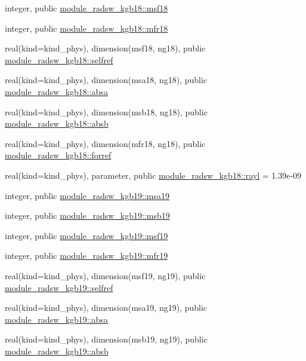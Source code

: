 \begin{DoxyCompactItemize}
integer, public \hyperlink{group__module__radsw__main_ga1d74002f71710887e45df89d3897a10a}{module\+\_\+radsw\+\_\+kgb18\+::msf18}
\item 
integer, public \hyperlink{group__module__radsw__main_ga9fa8140413e7ec769baea4f207e58393}{module\+\_\+radsw\+\_\+kgb18\+::mfr18}
\item 
real(kind=kind\+\_\+phys), dimension(msf18, ng18), public \hyperlink{group__module__radsw__main_ga488f807878d909b8f69457b0d7d8ac6a}{module\+\_\+radsw\+\_\+kgb18\+::selfref}
\item 
real(kind=kind\+\_\+phys), dimension(msa18, ng18), public \hyperlink{group__module__radsw__main_ga8a7787776bd057b1815e92a5f58b9cac}{module\+\_\+radsw\+\_\+kgb18\+::absa}
\item 
real(kind=kind\+\_\+phys), dimension(msb18, ng18), public \hyperlink{group__module__radsw__main_ga858680db0ee5e9a599639844a91f8f06}{module\+\_\+radsw\+\_\+kgb18\+::absb}
\item 
real(kind=kind\+\_\+phys), dimension(mfr18, ng18), public \hyperlink{group__module__radsw__main_ga0efc293c91de3d17b29ed713ff09d7a9}{module\+\_\+radsw\+\_\+kgb18\+::forref}
\item 
real(kind=kind\+\_\+phys), parameter, public \hyperlink{group__module__radsw__main_ga9cd3f07e259e4982c7ef2889fee6cccb}{module\+\_\+radsw\+\_\+kgb18\+::rayl} = 1.\+39e-\/09
\item 
integer, public \hyperlink{namespacemodule__radsw__kgb19_a498993cce64baa8f22c8dfdce632cf85}{module\+\_\+radsw\+\_\+kgb19\+::msa19}
\item 
integer, public \hyperlink{group__module__radsw__main_ga42771fcf9dd17b5c9d0d03cb2bf1c923}{module\+\_\+radsw\+\_\+kgb19\+::msb19}
\item 
integer, public \hyperlink{group__module__radsw__main_ga86778b12ff439f4f83fda891e7ae2bfe}{module\+\_\+radsw\+\_\+kgb19\+::msf19}
\item 
integer, public \hyperlink{group__module__radsw__main_ga57f837ef4316dc2441bca3fde3998156}{module\+\_\+radsw\+\_\+kgb19\+::mfr19}
\item 
real(kind=kind\+\_\+phys), dimension(msf19, ng19), public \hyperlink{group__module__radsw__main_gadb26cae00c05ac5c048a4db5a319a2eb}{module\+\_\+radsw\+\_\+kgb19\+::selfref}
\item 
real(kind=kind\+\_\+phys), dimension(msa19, ng19), public \hyperlink{group__module__radsw__main_gad9a6fc80122a2f06d9f2277d74e00c85}{module\+\_\+radsw\+\_\+kgb19\+::absa}
\item 
real(kind=kind\+\_\+phys), dimension(msb19, ng19), public \hyperlink{group__module__radsw__main_gad1171c012a1615c4b98eb3e95276867d}{module\+\_\+radsw\+\_\+kgb19\+::absb}

\end{DoxyCompactItemize}
